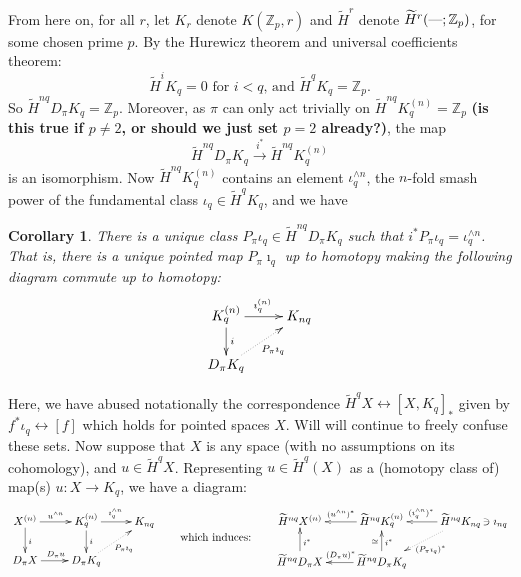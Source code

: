 \documentclass{article}
\newcommand{\Z}{\mathbb{Z}}
\newcommand{\sprod}{\wedge}
\renewcommand{\to}{\longrightarrow}
\newtheorem{cor}[thm]{Corollary}
\theoremstyle{definition}
\begin{document}
From here on, for all $r$, let $K_r$ denote $K(\Z_p,r)$ and $\widetilde H^r$ denote $\widetilde H^r(\textup{---};\Z_p)$, for some chosen prime $p$.  By the Hurewicz theorem and universal coefficients theorem: %
\[\widetilde H^iK_q=0\text{ \ for $i<q$, and \ }\widetilde H^qK_q=\Z_p.\]
So $\widetilde H^{nq}D_\pi K_q= \Z_p$.  Moreover, as $\pi$ can only act trivially on $\widetilde H^{nq} K_q^{(n)}=\Z_p$ \textbf{(is this true if $p\neq2$, or should we just set $p=2$ already?)}, the map
\[
\widetilde H^{nq} D_\pi K_q \xrightarrow{\ i^*\,} \widetilde H^{nq} K_q^{(n)} %
\]
is an isomorphism.  Now $\widetilde H^{nq} K_q^{(n)}$ contains an element $\iota_q^{\sprod n}$, the $n$-fold smash power of the fundamental class $\iota_q \in \widetilde H^q K_q$, and we have
\begin{cor}
There is a unique class $P_\pi \iota_q \in \widetilde H^{nq} D_\pi K_q$ such that $i^* P_\pi \iota_q = \iota_q^{\sprod n}$. That is, there is a unique pointed map $P_\pi\imath_q$ up to homotopy making the following diagram commute up to homotopy:
\[\xymatrix@R=6mm{
K_q^{(n)}\ar[d]^i\ar[r]^{\imath_q^{(n)}}&
K_{nq}\\
D_\pi K_q\ar@{.>}[ru]_{P_\pi\imath_q}
}\]
\end{cor}
\noindent Here, we have abused notationally the correspondence
$\widetilde H^q X  \longleftrightarrow [X, K_q]_\ast$ given by %
$f^* \iota_q  \longleftrightarrow [f]$ which holds for pointed spaces $X$. Will will continue to freely confuse these sets.
Now suppose that $X$ is any space (with no assumptions on its cohomology), and $u\in\widetilde H^qX$.
Representing $u\in \widetilde H^q(X)$ as a (homotopy class of) map(s) $u: X \to K_q$, we have a diagram:%
\[\xymatrix@R=6mm{
X^{(n)}\ar[r]^{u^{\wedge n}}\ar[d]^i&
K_q^{(n)}\ar[d]^i\ar[r]^{\imath_q^{\wedge n}}&
K_{nq}\\
D_\pi X\ar[r]^{D_\pi u}&
D_\pi K_q\ar@{.>}[ru]_{P_\pi\imath_q}
}
\raisebox{-.5cm}{\textup{\qquad which induces:\qquad}}
\xymatrix@R=6mm{
\widetilde H^{nq}X^{(n)}&
\widetilde H^{nq}K_q^{(n)}\ar[l]_{(u^{\wedge n})^*}&
\widetilde H^{nq}K_{nq}\makebox[0cm][l]{$\,\ni\imath_{nq}$}
\ar@{.>}[dl]^{(P_\pi\imath_q)^*}\ar[l]_{(\imath_q^{\wedge n})^*}\\
\widetilde H^{nq}D_\pi X\ar[u]_{i^*}&
\widetilde H^{nq}D_\pi K_q\ar[l]_{(D_\pi u)^*}\ar[u]_{i^*}^\cong
}\phantom{\,\ni\imath_{nq}}\]
\end{document}
